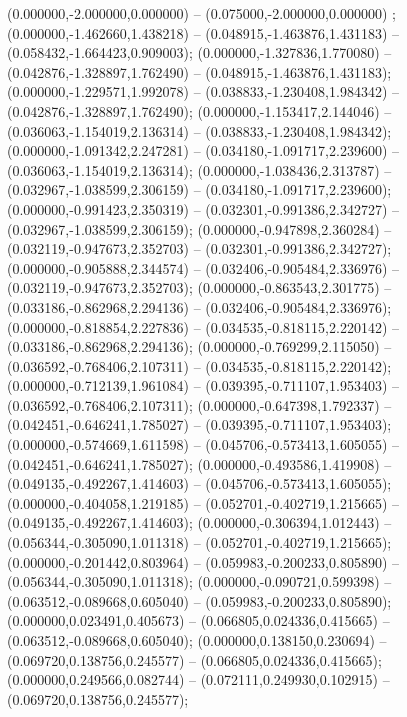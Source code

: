  (0.000000,-2.000000,0.000000) -- (0.075000,-2.000000,0.000000) ;
 (0.000000,-1.462660,1.438218) -- (0.048915,-1.463876,1.431183) -- (0.058432,-1.664423,0.909003);
 (0.000000,-1.327836,1.770080) -- (0.042876,-1.328897,1.762490) -- (0.048915,-1.463876,1.431183);
 (0.000000,-1.229571,1.992078) -- (0.038833,-1.230408,1.984342) -- (0.042876,-1.328897,1.762490);
 (0.000000,-1.153417,2.144046) -- (0.036063,-1.154019,2.136314) -- (0.038833,-1.230408,1.984342);
 (0.000000,-1.091342,2.247281) -- (0.034180,-1.091717,2.239600) -- (0.036063,-1.154019,2.136314);
 (0.000000,-1.038436,2.313787) -- (0.032967,-1.038599,2.306159) -- (0.034180,-1.091717,2.239600);
 (0.000000,-0.991423,2.350319) -- (0.032301,-0.991386,2.342727) -- (0.032967,-1.038599,2.306159);
 (0.000000,-0.947898,2.360284) -- (0.032119,-0.947673,2.352703) -- (0.032301,-0.991386,2.342727);
 (0.000000,-0.905888,2.344574) -- (0.032406,-0.905484,2.336976) -- (0.032119,-0.947673,2.352703);
 (0.000000,-0.863543,2.301775) -- (0.033186,-0.862968,2.294136) -- (0.032406,-0.905484,2.336976);
 (0.000000,-0.818854,2.227836) -- (0.034535,-0.818115,2.220142) -- (0.033186,-0.862968,2.294136);
 (0.000000,-0.769299,2.115050) -- (0.036592,-0.768406,2.107311) -- (0.034535,-0.818115,2.220142);
 (0.000000,-0.712139,1.961084) -- (0.039395,-0.711107,1.953403) -- (0.036592,-0.768406,2.107311);
 (0.000000,-0.647398,1.792337) -- (0.042451,-0.646241,1.785027) -- (0.039395,-0.711107,1.953403);
 (0.000000,-0.574669,1.611598) -- (0.045706,-0.573413,1.605055) -- (0.042451,-0.646241,1.785027);
 (0.000000,-0.493586,1.419908) -- (0.049135,-0.492267,1.414603) -- (0.045706,-0.573413,1.605055);
 (0.000000,-0.404058,1.219185) -- (0.052701,-0.402719,1.215665) -- (0.049135,-0.492267,1.414603);
 (0.000000,-0.306394,1.012443) -- (0.056344,-0.305090,1.011318) -- (0.052701,-0.402719,1.215665);
 (0.000000,-0.201442,0.803964) -- (0.059983,-0.200233,0.805890) -- (0.056344,-0.305090,1.011318);
 (0.000000,-0.090721,0.599398) -- (0.063512,-0.089668,0.605040) -- (0.059983,-0.200233,0.805890);
 (0.000000,0.023491,0.405673) -- (0.066805,0.024336,0.415665) -- (0.063512,-0.089668,0.605040);
 (0.000000,0.138150,0.230694) -- (0.069720,0.138756,0.245577) -- (0.066805,0.024336,0.415665);
 (0.000000,0.249566,0.082744) -- (0.072111,0.249930,0.102915) -- (0.069720,0.138756,0.245577);
